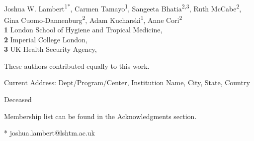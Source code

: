 \documentclass[
  10pt,
  letterpaper,
]{article}
\begin{document}
\vspace*{0.2in}

\begin{flushleft}
{\Large
\textbf{} %
}
\newline
\\
Joshua W. Lambert\textsuperscript{1*}, Carmen
Tamayo\textsuperscript{1}, Sangeeta Bhatia\textsuperscript{2,3}, Ruth
McCabe\textsuperscript{2}, Gina
Cuomo-Dannenburg\textsuperscript{2}, Adam
Kucharski\textsuperscript{1}, Anne Cori\textsuperscript{2}
\\
\bigskip
\textbf{1} London School of Hygiene and Tropical
Medicine, \\ \textbf{2} Imperial College London, \\ \textbf{3} UK Health
Security Agency, 
\bigskip

% 
%
\Yinyang These authors contributed equally to this work.


\textcurrency Current Address: Dept/Program/Center, Institution Name, City, State, Country %

\dag Deceased

\textpilcrow Membership list can be found in the Acknowledgments section.

* joshua.lambert@lshtm.ac.uk

\end{flushleft}
\end{document}

